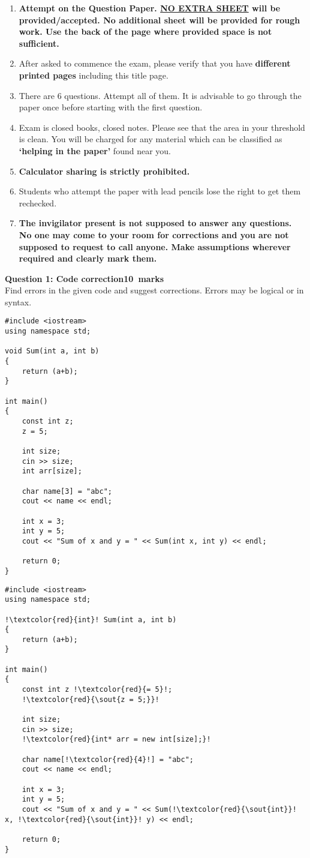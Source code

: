 \documentclass[12pt,a4paper]{article}
\def\QOne{10}
\begin{document}
\begin{enumerate}
\item \textbf{Attempt on the Question Paper. \underline{NO EXTRA SHEET} will be provided/accepted. No
additional sheet will be provided for rough work. Use the back of the page where
provided space is not sufficient.}
\item After asked to commence the exam, please verify that you have \textbf{\pageref{LastPage} different
printed pages} including this title page.
\item There are 6 questions. Attempt all of them. It is advisable to go through the paper once
before starting with the first question.
\item Exam is closed books, closed notes. Please see that the area in your threshold is clean.
You will be charged for any material which can be classified as \textbf{`helping in the paper'}
found near you.
\item \textbf{Calculator sharing is strictly prohibited.}
\item Students who attempt the paper with lead pencils lose the right to get them rechecked.
\item \textbf{The invigilator present is not supposed to answer any questions. No one may come
to your room for corrections and you are not supposed to request to call anyone.
Make assumptions wherever required and clearly mark them.}
\end{enumerate}
\newpage
\noindent\textbf{Question 1: Code correction\hfill \QOne~marks}\\
Find errors in the given code and suggest corrections. Errors may be logical or in syntax.
\begin{lstlisting}
#include <iostream>
using namespace std;

void Sum(int a, int b)
{
	return (a+b);
}

int main()
{
	const int z;
	z = 5;

	int size;
	cin >> size;
	int arr[size];

	char name[3] = "abc";
	cout << name << endl;

	int x = 3;
	int y = 5;
	cout << "Sum of x and y = " << Sum(int x, int y) << endl;

	return 0;
}
\end{lstlisting}
\begin{lstlisting}[escapechar=!]
#include <iostream>
using namespace std;

!\textcolor{red}{int}! Sum(int a, int b)
{
	return (a+b);
}

int main()
{
	const int z !\textcolor{red}{= 5}!;
	!\textcolor{red}{\sout{z = 5;}}!

	int size;
	cin >> size;
	!\textcolor{red}{int* arr = new int[size];}!

	char name[!\textcolor{red}{4}!] = "abc";
	cout << name << endl;

	int x = 3;
	int y = 5;
	cout << "Sum of x and y = " << Sum(!\textcolor{red}{\sout{int}}! x, !\textcolor{red}{\sout{int}}! y) << endl;

	return 0;
}
\end{lstlisting}
\end{document}

